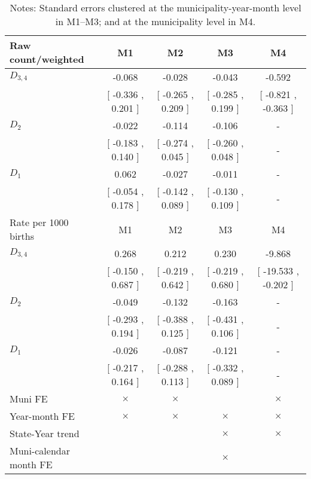 \begin{table}[!ht]
\centering
\caption{Effects of Drought on very_preterm}\label{tab:twfe_very_preterm}
\fontsize{10pt}{12pt}\selectfont
\begin{tabular}{lcccc}
\toprule
  Raw count/weighted &\multicolumn{1}{c}{M1}&\multicolumn{1}{c}{M2}&\multicolumn{1}{c}{M3}&\multicolumn{1}{c}{M4} \\
\midrule
 $ D_{3,4} $ &    -0.068 &    -0.028 &    -0.043 &    -0.592 \\ 
 & [    -0.336 ,     0.201 ] & [    -0.265 ,     0.209 ] & [    -0.285 ,     0.199 ] & [    -0.821 ,    -0.363 ] \\ 
\addlinespace
 $ D_2 $ &    -0.022 &    -0.114 &    -0.106 & - \\ 
 & [    -0.183 ,     0.140 ] & [    -0.274 ,     0.045 ] & [    -0.260 ,     0.048 ] & - \\ 
\addlinespace
 $ D_1 $ &     0.062 &    -0.027 &    -0.011 & - \\ 
 & [    -0.054 ,     0.178 ] & [    -0.142 ,     0.089 ] & [    -0.130 ,     0.109 ] & - \\ 
\addlinespace
\midrule
  Rate per 1000 births &\multicolumn{1}{c}{M1}&\multicolumn{1}{c}{M2}&\multicolumn{1}{c}{M3}&\multicolumn{1}{c}{M4} \\
\midrule
 $ D_{3,4} $ &     0.268 &     0.212 &     0.230 &    -9.868 \\ 
 & [    -0.150 ,     0.687 ] & [    -0.219 ,     0.642 ] & [    -0.219 ,     0.680 ] & [   -19.533 ,    -0.202 ] \\ 
\addlinespace
 $ D_2 $ &    -0.049 &    -0.132 &    -0.163 & - \\ 
 & [    -0.293 ,     0.194 ] & [    -0.388 ,     0.125 ] & [    -0.431 ,     0.106 ] & - \\ 
\addlinespace
 $ D_1 $ &    -0.026 &    -0.087 &    -0.121 & - \\ 
 & [    -0.217 ,     0.164 ] & [    -0.288 ,     0.113 ] & [    -0.332 ,     0.089 ] & - \\ 
\midrule
  Muni FE & $ \times $ & $ \times $ &  & $ \times $  \\
  Year-month FE & $ \times $ & $ \times $ & $ \times $ & $ \times $ \\
  State-Year trend &  &  & $ \times $ & $ \times $ \\
  Muni-calendar month FE &  &  & $ \times $ & \\
\bottomrule
\end{tabular}
\caption*{\footnotesize{Notes: Standard errors clustered at the municipality-year-month level in M1--M3; and at the municipality level in M4.}}
\end{table}
